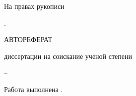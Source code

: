 
%
%
%
%

\thispagestyle{empty}

\begin{center}
	\disscouncil
	\par
\end{center}

\vspace{10mm}
\begin{flushright}
На правах рукописи

\end{flushright}

\vspace{10mm}
\begin{center}
{\bf \large \dissauthor}
\end{center}

\vspace{2mm}
\begin{center}
{\bf \large \disstitle
\par}

\vspace{10mm}
{%
\specnum. \specname
}

\vspace{10mm}
\MakeUppercase{Автореферат}

диссертации на соискание ученой степени

\edudegree
\end{center}


\vfill
\begin{center}
{\disscouncilcity -- \dissyear}
\end{center}



\newpage
\thispagestyle{empty}
Работа выполнена \dissorgsyn.


